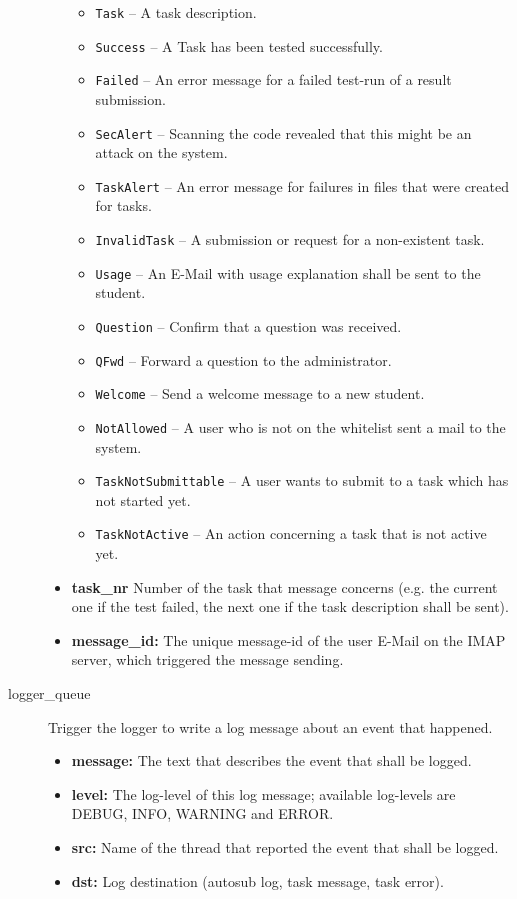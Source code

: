 \begin{description}
\begin{itemize}
            \begin{itemize}
				\item {\tt Task} -- A task description.
				\item {\tt Success} -- A Task has been tested successfully.
				\item {\tt Failed} -- An error message for a failed test-run of a result
					submission.
				\item {\tt SecAlert} -- Scanning the code revealed that this might be an
					attack on the system.
				\item {\tt TaskAlert} -- An error message for failures in files that were
					created for tasks.
				\item {\tt InvalidTask} -- A submission or request for a non-existent task.
				\item {\tt Usage} -- An E-Mail with usage explanation shall be sent to the
					student.
				\item {\tt Question} -- Confirm that a question was received.
				\item {\tt QFwd} -- Forward a question to the administrator.
				\item {\tt Welcome} -- Send a welcome message to a new student.
				\item {\tt NotAllowed} -- A user who is not on the whitelist sent a mail
					to the system.
				\item {\tt TaskNotSubmittable} -- A user wants to submit to a task
					which has not started yet.
				\item {\tt TaskNotActive} -- An action concerning a task that is not active
					yet.
            \end{itemize}

        \item {\bf task\_nr} Number of the task that message concerns (e.g. the current
			one if the test failed, the next one if the task description shall be sent).
        \item {\bf message\_id:} The unique message-id of the user E-Mail on the IMAP server,
			which triggered the message sending.
    \end{itemize}

\item [logger\_queue] Trigger the logger to write a log message about an event that happened.
    \begin{itemize}
        \item {\bf message:} The text that describes the event that shall be logged.
        \item {\bf level:} The log-level of this log message; available log-levels
			are DEBUG, INFO, WARNING and ERROR.
        \item {\bf src:} Name of the thread that reported the event that shall be logged.
		\item {\bf dst:} Log destination (autosub log, task message, task error).
    \end{itemize}


\end{description}
